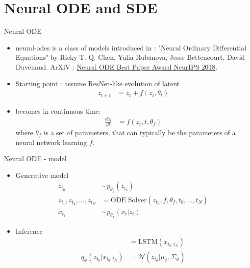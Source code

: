 \section{Neural ODE and SDE}\label{Neural ODE and SDE}

\begin{frame}{Neural ODE}
    \begin{itemize}
        \item \glspl{neural-ode} is a class of models introduced in \cite{chen_neural_2019} : "Neural Ordinary Differential Equations" 
by Ricky T. Q. Chen, Yulia Rubanova, Jesse Bettencourt, David Duvenaud. 
ArXiV : \href{https://arxiv.org/abs/1806.07366}{Neural ODE Best Paper Award NeurIPS 2018}.
        \item Starting point : assume ResNet-like evolution of latent
            \begin{align}
                z_{t+1} &= z_t + f(z_t, \theta_t)
            \end{align}
        \item becomes in continuous time:
        \begin{align}
                \frac{dz_t}{dt} &= f(z_t, t, \theta_f)
        \end{align}
            where $\theta_f$ is a set of parameters, that can typically be the parameters of 
            a neural network learning $f$.
    \end{itemize}
\end{frame}

\begin{frame}{Neural ODE - model}
    \begin{itemize}
        \item Generative model
            \begin{align}
                z_{t_0} &\sim p_{\theta_z}(z_{t_0}) \\
                z_{t_1}, z_{t_2}, ..., z_{t_N} &= \text{ODE Solver}(z_{t_0}, f, \theta_f, t_0, ..., t_N ) \\
                x_{t_i} &\sim p_{\theta_x}(x_t \vert z_t)
            \end{align}
        \item Inference
        \begin{align}
                [\mu_\phi, \Sigma_\phi] &= \text{LSTM} (x_{t_0:t_N})   \\
                q_{\phi}(z_{t_0} \vert x_{t_0:t_N}) &= \mathcal{N}(z_{t_0} \vert \mu_{\phi}, \Sigma_\phi)
        \end{align}
    \end{itemize}
\end{frame}

